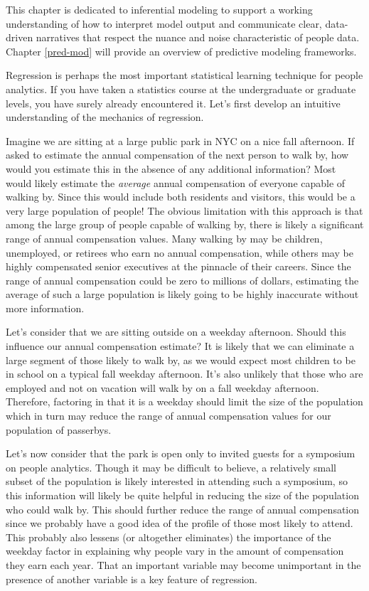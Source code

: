 \documentclass[
]{book}
\begin{document}
This chapter is dedicated to inferential modeling to support a working understanding of how to interpret model output and communicate clear, data-driven narratives that respect the nuance and noise characteristic of people data. Chapter \ref{pred-mod} will provide an overview of predictive modeling frameworks.

Regression is perhaps the most important statistical learning technique for people analytics. If you have taken a statistics course at the undergraduate or graduate levels, you have surely already encountered it. Let's first develop an intuitive understanding of the mechanics of regression.

Imagine we are sitting at a large public park in NYC on a nice fall afternoon. If asked to estimate the annual compensation of the next person to walk by, how would you estimate this in the absence of any additional information? Most would likely estimate the \emph{average} annual compensation of everyone capable of walking by. Since this would include both residents and visitors, this would be a very large population of people! The obvious limitation with this approach is that among the large group of people capable of walking by, there is likely a significant range of annual compensation values. Many walking by may be children, unemployed, or retirees who earn no annual compensation, while others may be highly compensated senior executives at the pinnacle of their careers. Since the range of annual compensation could be zero to millions of dollars, estimating the average of such a large population is likely going to be highly inaccurate without more information.

Let's consider that we are sitting outside on a weekday afternoon. Should this influence our annual compensation estimate? It is likely that we can eliminate a large segment of those likely to walk by, as we would expect most children to be in school on a typical fall weekday afternoon. It's also unlikely that those who are employed and not on vacation will walk by on a fall weekday afternoon. Therefore, factoring in that it is a weekday should limit the size of the population which in turn may reduce the range of annual compensation values for our population of passerbys.

Let's now consider that the park is open only to invited guests for a symposium on people analytics. Though it may be difficult to believe, a relatively small subset of the population is likely interested in attending such a symposium, so this information will likely be quite helpful in reducing the size of the population who could walk by. This should further reduce the range of annual compensation since we probably have a good idea of the profile of those most likely to attend. This probably also lessens (or altogether eliminates) the importance of the weekday factor in explaining why people vary in the amount of compensation they earn each year. That an important variable may become unimportant in the presence of another variable is a key feature of regression.
\end{document}
